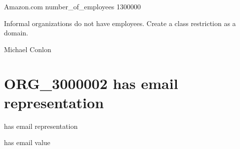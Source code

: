 \documentclass[letterpaper,10pt,english]{sphinxmanual}
\begin{document}
\begin{sphinxShadowBox}

\sphinxAtStartPar
Amazon.com number\_of\_employees 1300000
\end{sphinxShadowBox}

\begin{sphinxShadowBox}

\sphinxAtStartPar
Informal organizations do not have employees.  Create a class restriction as a domain.
\end{sphinxShadowBox}

\begin{sphinxShadowBox}

\sphinxAtStartPar
Michael Conlon 
\end{sphinxShadowBox}
\begin{quote}

\ignorespaces \end{quote}


\section{ORG\_3000002 \sphinxhyphen{} has email representation}
\label{\detokenize{doc-ORG_3000002:org-3000002-has-email-representation}}\label{\detokenize{doc-ORG_3000002:index-0}}\label{\detokenize{doc-ORG_3000002::doc}}
\begin{sphinxShadowBox}

\sphinxAtStartPar
has email representation
\end{sphinxShadowBox}

\begin{sphinxShadowBox}

\sphinxAtStartPar
has email value
\end{sphinxShadowBox}

\begin{sphinxShadowBox}

\sphinxAtStartPar
{\hyperref[\detokenize{doc-OBI_0002815::doc}]{}}
\end{sphinxShadowBox}
\end{document}
